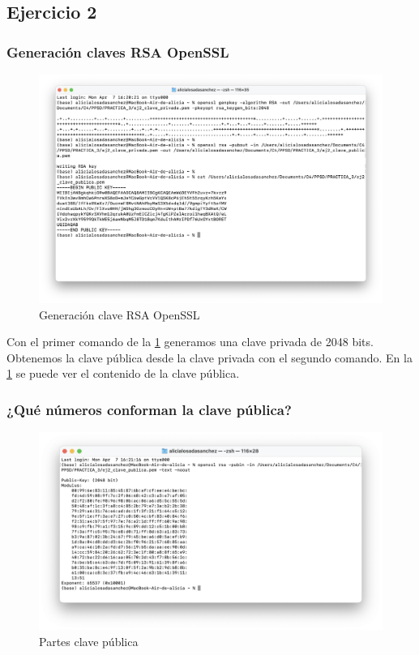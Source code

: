 \subsection{Ejercicio 2}
\graphicspath{ {img/02} }

\subsubsection{Generación claves RSA OpenSSL}

\begin{figure}[H]   
    \includegraphics[width=15cm]{ej2_a.png}
    \caption{Generación clave RSA OpenSSL}
    \label{fig:generacion_rsa_openssl}
\end{figure}

Con el primer comando de la \ref{fig:generacion_rsa_openssl} generamos una clave privada de 2048 bits. Obtenemos la clave pública desde la clave privada con el segundo comando. En la \ref{fig:generacion_rsa_openssl} se puede ver el contenido de la clave pública. 


\subsubsection{¿Qué números conforman la clave pública?}

\begin{figure}[H]   
    \includegraphics[width=15cm]{ej2_b.png}
    \caption{Partes clave pública}
    \label{fig:partes_clave_publica_rsa_openssl}
\end{figure}

